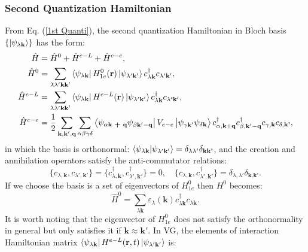 \documentclass[12pt,english,a4paper]{article}
\newcommand{\dg}{\dagger}
\begin{document}
	\subsubsection{Second Quantization Hamiltonian}
\quad From Eq. (\ref{1st Quanti}), the second quantization Hamiltonian in Bloch basis $\{\ket{\psi_{\lambda \textbf{k}}}\}$ has the form:
	\begin{align}
		\hat{H} &= \hat{H}^0 + \hat{H}^{e-L}  + \hat{H}^{e-e}\nonumber,\\
		\label{Second Hamiltonian}
		\hat{H}^0 &= \sum_{\lambda \lambda' \textbf{k}\textbf{k}'} \bra{\psi_{\lambda \textbf{k}}} H^0_{1e} (\textbf{r})\ket{\psi_{\lambda' \textbf{k}'}} c^\dg_{\lambda \textbf{k}} c_{\lambda' \textbf{k}
		'} ,\\
		\hat{H}^{e-L} &= \sum_{\lambda \lambda' \textbf{k}\textbf{k}'} \bra{\psi_{\lambda \textbf{k}}} H^{e-L} (\textbf{r})\ket{\psi_{\lambda' \textbf{k}'}} c^\dg_{\lambda \textbf{k}} c_{\lambda' \textbf{k}
			'}\nonumber ,\\
\hat{H}^{e-e}	&= \frac{1}{2} \sum_{\textbf{k}, \textbf{k}', \textbf{q}} \sum_{\alpha \beta \gamma \delta} \bra{\psi_{\alpha \textbf{k + q}} \psi_{\beta \textbf{k}' - \textbf{q}}} V_{e-e} \ket{\psi_{\gamma \textbf{k}'} \psi_{\delta \textbf{k}}} c_{\alpha, \textbf{k}+\textbf{q}}^\dg c_{\beta, \textbf{k}' - \textbf{q}}^\dg c_{\gamma, \textbf{k}}c_{\delta, \textbf{k'}} \nonumber,
	\end{align}
in which the basis is orthonormal: $\braket{\psi_{\lambda \textbf{k}}}{\psi_{\lambda' \textbf{k}'}} = \delta_{\lambda\lambda'}\delta_{\textbf{k}\textbf{k'}}$, and the creation and annihilation operators satisfy the anti-commutator relations:
	\begin{equation}
		\label{fermion comm}
		\big\{c_{\lambda,\textbf{k}}, c_{\lambda', \textbf{k}'}\big\} =\big\{c^\dg_{\lambda,\textbf{k}}, c^\dg_{\lambda', \textbf{k}'}\big\} = 0, \quad \big\{c_{\lambda,\textbf{k}}, c^\dg_{\lambda', \textbf{k}'}\big\} = \delta_{\lambda,\lambda'}\delta_{\textbf{k},\textbf{k'}}.
	\end{equation}
\quad If we choose the basis is a set of eigenvectors of $H^0_{1e}$ then $H^0$ becomes:
	\begin{equation}
		\hat{H}^0 = \sum_{\lambda \textbf{k}} \varepsilon_{\lambda}(\textbf{k})c^\dg_{\lambda \textbf{k}} c_{\lambda \textbf{k}}.
	\end{equation}
\quad It is worth noting that the eigenvector of $H^0_{1e}$ does not satisfy the orthonormality in general but only satisfies it if $\textbf{k} \approx \textbf{k}'$. In VG, the elements of interaction Hamiltonian matrix $\bra{\psi_{\lambda\textbf{k}}}H^{e-L}(\textbf{r},t)\ket{\psi_{\lambda'\textbf{k}'}}$ is:
\end{document}
